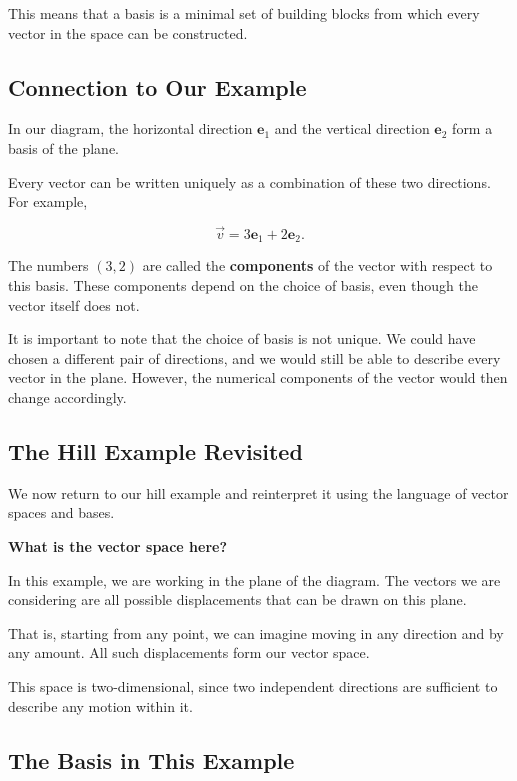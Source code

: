 \documentclass[11pt,openany]{book}
\theoremstyle{definition}
\begin{document}
\medskip

This means that a basis is a minimal set of building blocks from which every vector in the space can be constructed.

\medskip

\subsection{Connection to Our Example}

In our diagram, the horizontal direction $\mathbf{e}_1$ and the vertical direction $\mathbf{e}_2$ form a basis of the plane.

Every vector can be written uniquely as a combination of these two directions. 
For example,

\[
\vec{v} = 3\mathbf{e}_1 + 2\mathbf{e}_2.
\]

The numbers $(3,2)$ are called the \textbf{components} of the vector with respect to this basis.
These components depend on the choice of basis, even though the vector itself does not.
\medskip

It is important to note that the choice of basis is not unique. 
We could have chosen a different pair of directions, and we would still be able to describe every vector in the plane. 
However, the numerical components of the vector would then change accordingly.


\subsection{The Hill Example Revisited}

We now return to our hill example and reinterpret it using the language of vector spaces and bases.

\medskip
 
\textbf{What is the vector space here?}

In this example, we are working in the plane of the diagram. 
The vectors we are considering are all possible displacements that can be drawn on this plane.

That is, starting from any point, we can imagine moving in any direction and by any amount. 
All such displacements form our vector space.

This space is two-dimensional, since two independent directions are sufficient to describe any motion within it.

\medskip

\subsection{The Basis in This Example}
\end{document}
